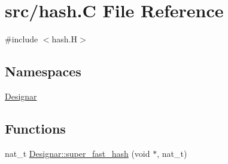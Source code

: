 \hypertarget{hash_8_c}{}\section{src/hash.C File Reference}
\label{hash_8_c}
{\ttfamily \#include $<$hash.\+H$>$}\newline
\subsection*{Namespaces}
\begin{DoxyCompactItemize}
\item 
 \hyperlink{namespace_designar}{Designar}
\end{DoxyCompactItemize}
\subsection*{Functions}
\begin{DoxyCompactItemize}
\item 
nat\+\_\+t \hyperlink{namespace_designar_afd5712d16b3ae1c1c7d59f1004cd96fd}{Designar\+::super\+\_\+fast\+\_\+hash} (void $\ast$, nat\+\_\+t)
\end{DoxyCompactItemize}
